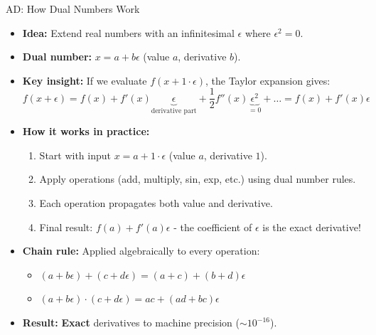 \documentclass[10pt, aspectratio=169]{beamer}
\begin{document}
	\begin{frame}{AD: How Dual Numbers Work}
		\begin{itemize}
			\item \textbf{Idea:} Extend real numbers with an infinitesimal $\epsilon$ where $\epsilon^2 = 0$.
			\item \textbf{Dual number:} $x = a + b\epsilon$ (value $a$, derivative $b$).
			\item \textbf{Key insight:} If we evaluate $f(x + 1\cdot\epsilon)$, the Taylor expansion gives:
			\begin{equation}
				f(x + \epsilon) = f(x) + f'(x)\underbrace{\epsilon}_{\text{derivative part}} + \frac{1}{2}f''(x)\underbrace{\epsilon^2}_{=0} + \dots = f(x) + f'(x)\epsilon
			\end{equation}
			\item \textbf{How it works in practice:}
			\begin{enumerate}
				\item Start with input $x = a + 1\cdot\epsilon$ (value $a$, derivative $1$).
				\item Apply operations (add, multiply, sin, exp, etc.) using dual number rules.
				\item Each operation propagates both value and derivative.
				\item Final result: $f(a) + f'(a)\epsilon$ - the coefficient of $\epsilon$ is the exact derivative!
			\end{enumerate}
			\item \textbf{Chain rule:} Applied algebraically to every operation:
			\begin{itemize}
				\item $(a + b\epsilon) + (c + d\epsilon) = (a+c) + (b+d)\epsilon$
				\item $(a + b\epsilon) \cdot (c + d\epsilon) = ac + (ad+bc)\epsilon$
			\end{itemize}
			\item \textbf{Result:} \textbf{Exact} derivatives to machine precision ($\sim 10^{-16}$).
		\end{itemize}
	\end{frame}
	
\end{document}
